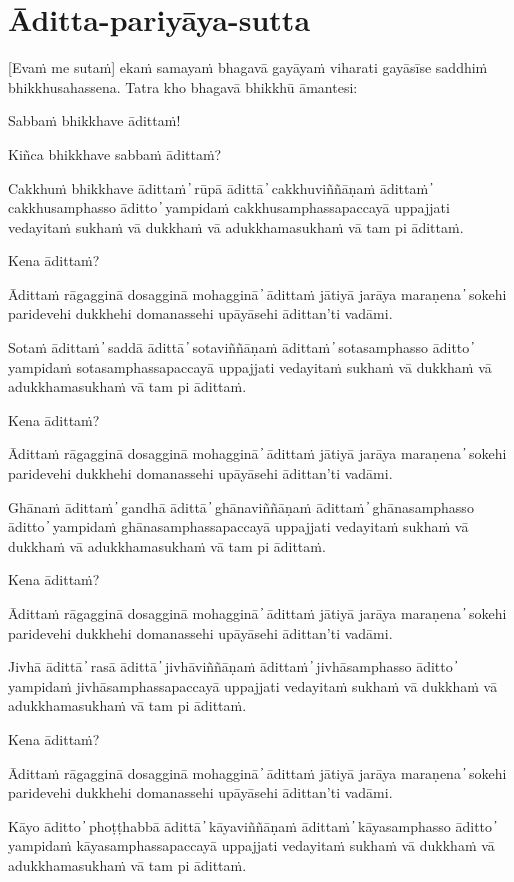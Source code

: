 \section{Āditta-pariyāya-sutta}

[Evaṁ me sutaṁ] ekaṁ samayaṁ bhagavā gayāyaṁ viharati gayāsīse saddhiṁ bhikkhusahassena. Tatra kho bhagavā bhikkhū āmantesi:

Sabbaṁ bhikkhave ādittaṁ!

Kiñca bhikkhave sabbaṁ ādittaṁ?

Cakkhuṁ bhikkhave ādittaṁ  ̓  rūpā ādittā  ̓  cakkhuviññāṇaṁ ādittaṁ  ̓  cakkhusamphasso āditto  ̓  yampidaṁ cakkhusamphassapaccayā uppajjati vedayitaṁ sukhaṁ vā dukkhaṁ vā adukkhamasukhaṁ vā tam pi ādittaṁ.

Kena ādittaṁ?

Ādittaṁ rāgagginā dosagginā mohagginā  ̓  ādittaṁ jātiyā jarāya maraṇena  ̓  sokehi paridevehi dukkhehi domanassehi upāyāsehi ādittan’ti vadāmi.

Sotaṁ ādittaṁ  ̓  saddā ādittā  ̓  sotaviññāṇaṁ ādittaṁ  ̓  sotasamphasso āditto  ̓  yampidaṁ sotasamphassapaccayā uppajjati vedayitaṁ sukhaṁ vā dukkhaṁ vā adukkhamasukhaṁ vā tam pi ādittaṁ.

Kena ādittaṁ?

Ādittaṁ rāgagginā dosagginā mohagginā  ̓  ādittaṁ jātiyā jarāya maraṇena  ̓  sokehi paridevehi dukkhehi domanassehi upāyāsehi ādittan’ti vadāmi.

Ghānaṁ ādittaṁ  ̓  gandhā ādittā  ̓  ghānaviññāṇaṁ ādittaṁ  ̓  ghānasamphasso āditto  ̓  yampidaṁ ghānasamphassapaccayā uppajjati vedayitaṁ sukhaṁ vā dukkhaṁ vā adukkhamasukhaṁ vā tam pi ādittaṁ.

Kena ādittaṁ?

Ādittaṁ rāgagginā dosagginā mohagginā  ̓  ādittaṁ jātiyā jarāya maraṇena  ̓  sokehi paridevehi dukkhehi domanassehi upāyāsehi ādittan’ti vadāmi.

Jivhā ādittā  ̓  rasā ādittā  ̓  jivhāviññāṇaṁ ādittaṁ  ̓  jivhāsamphasso āditto  ̓  yampidaṁ jivhāsamphassapaccayā uppajjati vedayitaṁ sukhaṁ vā dukkhaṁ vā adukkhamasukhaṁ vā tam pi ādittaṁ.

Kena ādittaṁ?

Ādittaṁ rāgagginā dosagginā mohagginā  ̓  ādittaṁ jātiyā jarāya maraṇena  ̓  sokehi paridevehi dukkhehi domanassehi upāyāsehi ādittan’ti vadāmi.

Kāyo āditto  ̓  phoṭṭhabbā ādittā  ̓  kāyaviññāṇaṁ ādittaṁ  ̓  kāyasamphasso āditto  ̓  yampidaṁ kāyasamphassapaccayā uppajjati vedayitaṁ sukhaṁ vā dukkhaṁ vā adukkhamasukhaṁ vā tam pi ādittaṁ.

